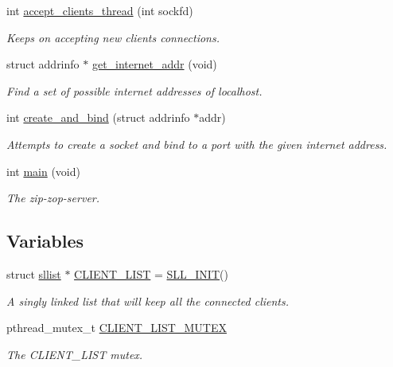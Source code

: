 \begin{DoxyCompactItemize}
int \hyperlink{zip-zop-server_8c_aecda02796082ba70b0c51545862d03a6}{accept\+\_\+clients\+\_\+thread} (int sockfd)
\begin{DoxyCompactList}\small\item\em Keeps on accepting new clients connections. \end{DoxyCompactList}\item 
struct addrinfo $\ast$ \hyperlink{zip-zop-server_8c_a2d9748875d07382b9dbecb97c6cd9b62}{get\+\_\+internet\+\_\+addr} (void)
\begin{DoxyCompactList}\small\item\em Find a set of possible internet addresses of localhost. \end{DoxyCompactList}\item 
int \hyperlink{zip-zop-server_8c_a0ecdeaf556729d827a07915b7a89866c}{create\+\_\+and\+\_\+bind} (struct addrinfo $\ast$addr)
\begin{DoxyCompactList}\small\item\em Attempts to create a socket and bind to a port with the given internet address. \end{DoxyCompactList}\item 
int \hyperlink{zip-zop-server_8c_a840291bc02cba5474a4cb46a9b9566fe}{main} (void)
\begin{DoxyCompactList}\small\item\em The zip-\/zop-\/server. \end{DoxyCompactList}\end{DoxyCompactItemize}
\subsection*{Variables}
\begin{DoxyCompactItemize}
\item 
struct \hyperlink{structsllist}{sllist} $\ast$ \hyperlink{zip-zop-server_8c_a32076dcdfaf1057a014d74d01cc7e08e}{C\+L\+I\+E\+N\+T\+\_\+\+L\+I\+ST} = \hyperlink{sllist_8h_a4f1348bb9eb6fe8c2b112e39c1887290}{S\+L\+L\+\_\+\+I\+N\+IT}()
\begin{DoxyCompactList}\small\item\em A singly linked list that will keep all the connected clients. \end{DoxyCompactList}\item 
pthread\+\_\+mutex\+\_\+t \hyperlink{zip-zop-server_8c_ac58873310e66c9bfafdbc798a8a7c7e2}{C\+L\+I\+E\+N\+T\+\_\+\+L\+I\+S\+T\+\_\+\+M\+U\+T\+EX}
\begin{DoxyCompactList}\small\item\em The {\ttfamily C\+L\+I\+E\+N\+T\+\_\+\+L\+I\+ST} mutex. \end{DoxyCompactList}\end{DoxyCompactItemize}


